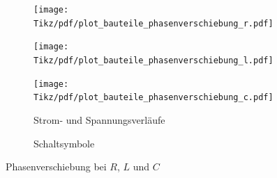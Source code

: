 \begin{frame}
{    \begin{figure}[H]\centering
        \begin{subfigure}{0.68\textwidth}\centering
            \texttt{[image: Tikz/pdf/plot\_bauteile\_phasenverschiebung\_r.pdf]}
        \end{subfigure}%
        \begin{subfigure}{0.28\textwidth}\centering
        \end{subfigure}\hfill%
        \begin{subfigure}{0.68\textwidth}\centering
            \texttt{[image: Tikz/pdf/plot\_bauteile\_phasenverschiebung\_l.pdf]}
        \end{subfigure}%
        \begin{subfigure}{0.28\textwidth}\centering
        \end{subfigure}\hfill%
        \begin{subfigure}{0.68\textwidth}\centering
            \texttt{[image: Tikz/pdf/plot\_bauteile\_phasenverschiebung\_c.pdf]}
            \caption{Strom- und Spannungsverläufe}
        \end{subfigure}%
        \begin{subfigure}{0.28\textwidth}\centering
            \caption{Schaltsymbole}
        \end{subfigure}
        \caption{Phasenverschiebung bei $R$, $L$ und $C$}\label{fig:bauteile:phasenverschiebung}
    \end{figure}

}
\end{frame}
